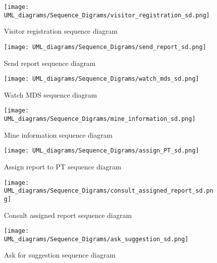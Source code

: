 \vfill
\begin{figure}[H]
  \centering
  \texttt{[image: UML\_diagrams/Sequence\_Digrams/visitor\_registration\_sd.png]}
  \caption{Visitor registration sequence diagram}
  \label{fig:visitor_signup_sd}
\end{figure}

\vfill
\newpage
\null
\vfill

\begin{figure}[H]
  \centering
  \texttt{[image: UML\_diagrams/Sequence\_Digrams/send\_report\_sd.png]}
  \caption{Send report sequence diagram}
  \label{fig:send_report_sd}
\end{figure}

\vfill
\newpage
\null
\vfill

\begin{figure}[H]
  \centering
  \texttt{[image: UML\_diagrams/Sequence\_Digrams/watch\_mds\_sd.png]}
  \caption{Watch MDS sequence diagram}
  \label{fig:watch_mds_sd}
\end{figure}

\vfill
\newpage
\null
\vfill

\begin{figure}[H]
  \centering
  \texttt{[image: UML\_diagrams/Sequence\_Digrams/mine\_information\_sd.png]}
  \caption{Mine information sequence diagram}
  \label{fig:mine_information_sd}
\end{figure}

\vfill
\newpage
\null
\vfill

\begin{figure}[H]
  \centering
  \texttt{[image: UML\_diagrams/Sequence\_Digrams/assign\_PT\_sd.png]}
  \caption{Assign report to PT sequence diagram}
  \label{fig:assign_PT_sd}
\end{figure}

\vfill
\newpage
\null
\vfill

\begin{figure}[H]
  \centering
  \texttt{[image: UML\_diagrams/Sequence\_Digrams/consult\_assigned\_report\_sd.png]}
  \caption{Consult assigned report sequence diagram}
  \label{fig:consult_assigned_report_sd}
\end{figure}

\vfill
\newpage
\null
\vfill

\begin{figure}[H]
  \centering
  \texttt{[image: UML\_diagrams/Sequence\_Digrams/ask\_suggestion\_sd.png]}
  \caption{Ask for suggestion sequence diagram}
  \label{fig:ask_suggestion_sd}
\end{figure}

\vfill
\newpage
